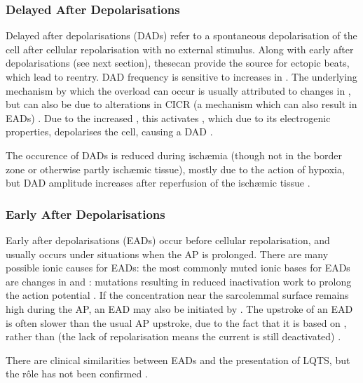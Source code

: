 \documentclass[../thesis-main.tex]{subfiles}
\begin{document}
 \subsubsection{Delayed After Depolarisations}
 \label{subsubsec:dad}
 Delayed after depolarisations (DADs) refer to a spontaneous depolarisation of the cell after cellular repolarisation with no external stimulus. Along with early after depolarisations (see next section), thesecan provide the source for ectopic beats, which lead to reentry. DAD frequency is sensitive to increases in \cai{}. The underlying mechanism by which the \cai{} overload can occur is usually attributed to changes in \ica{}, but can also be due to alterations in CICR (a mechanism which can also result in EADs) \citep{Volders1997}. Due to the increased \cai{}, this activates \inaca{}, which due to its electrogenic properties, depolarises the cell, causing a DAD \citep{Clusin2003}.
 
 The occurence of DADs is reduced during isch\ae{}mia (though not in the border zone or otherwise partly isch\ae{}mic tissue), mostly due to the action of hypoxia, but DAD amplitude increases after reperfusion of the isch\ae{}mic tissue \citep{Coetzee1987, Ferrier1985}.
 
 \subsubsection{Early After Depolarisations}
 \label{subsubsec:ead}
 Early after depolarisations (EADs) occur before cellular repolarisation, and usually occurs under situations when the AP is prolonged. There are many possible ionic causes for EADs: the most commonly muted ionic bases for EADs are changes in \ica{} and \ina{}: \ina{} mutations resulting in reduced inactivation work to prolong the action potential \citep{Clancy2005, Hashambhoy2011, Hiraoka1992}. If the \ca{} concentration near the sarcolemmal surface remains high during the AP, an EAD may also be initiated by \inaca{ } \citep{Volders1997}. The upstroke of an EAD is often slower than the usual AP upstroke, due to the fact that it is based on \ica{}, rather than \ina{} (the lack of repolarisation means the \ina{} current is still deactivated) \citep{Clusin2003}.
 
 There are clinical similarities between EADs and the presentation of LQTS, but the r\^ole has not been confirmed \citep{Clusin2003}.
 
\end{document}
